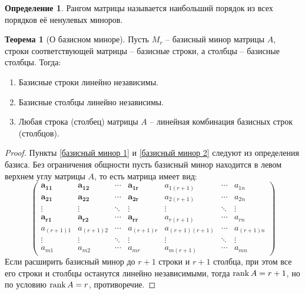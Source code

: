 \documentclass[12pt]{article}
\theoremstyle{definition}
\newtheorem{theorem}{Теорема}[section]
\newtheorem{definition}{Определение}
\begin{document}
\begin{definition}
    Рангом матрицы называется наибольший порядок из всех порядков её ненулевых миноров.
\end{definition}
\begin{theorem}[О базисном миноре]
    Пусть $M_r$ – базисный минор матрицы $A$, строки соответствующей матрицы – базисные строки, а столбцы – базисные столбцы. Тогда:
    \begin{multicols}{2}
        \begin{enumerate}
        \item \label{базисный минор 1} Базисные строки линейно независимы.
        \item \label{базисный минор 2} Базисные столбцы линейно независимы.
        \item Любая строка (столбец) матрицы $A$ – линейная комбинация базисных строк (столбцов).
    \end{enumerate}
    \end{multicols}
\end{theorem}
\begin{proof}
    Пункты \ref{базисный минор 1} и \ref{базисный минор 2} следуют из определения базиса. Без ограничения общности пусть базисный минор находится в левом верхнем углу матрицы $A$, то есть матрица имеет вид:
    $$\begin{pmatrix}
        \boldsymbol{a_{11}} & \boldsymbol{a_{12}} & \cdots & \boldsymbol{a_{1r}} & a_{1(r+1)} & \cdots & a_{1n}\\
        \boldsymbol{a_{21}} & \boldsymbol{a_{22}} & \cdots & \boldsymbol{a_{2r}} & a_{2(r+1)} & \cdots & a_{2n}\\
        \vdots & \vdots & \ddots & \vdots & \vdots & \ddots & \vdots\\
        \boldsymbol{a_{r1}} & \boldsymbol{a_{r2}} & \cdots & \boldsymbol{a_{rr}} & a_{r(r+1)} & \cdots & a_{rn}\\
        a_{(r+1)1} & a_{(r+1)2} & \cdots & a_{(r+1)r} & a_{(r+1)(r+1)} & \cdots & a_{(r+1)n}\\
        \vdots & \vdots & \ddots & \vdots & \vdots & \ddots & \vdots\\
        a_{m1} & a_{m2} & \cdots & a_{mr} & a_{m(r+1)} & \cdots & a_{mn}
    \end{pmatrix}$$
    Если расширить базисный минор до $r+1$ строки и $r+1$ столбца, при этом все его строки и столбцы останутся линейно независимыми, тогда $\rank A=r+1$, но по условию $\rank A=r$, противоречие.
\end{proof}
\end{document}
